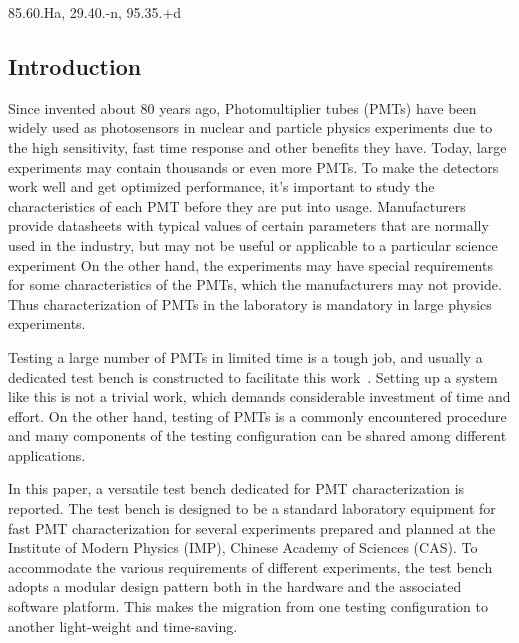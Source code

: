 \documentclass[a4paper,10pt,twoside]{cpc-hepnp}
\begin{document}
\begin{CJK*}{UTF8}{gbsn}
\begin{pacs}
85.60.Ha, 29.40.-n, 95.35.+d 
\end{pacs}

%

\begin{multicols}{2}

\section{Introduction}
\label{sec:introduction}

Since invented about 80 years ago, Photomultiplier tubes (PMTs) have been widely used as photosensors in nuclear and particle physics experiments due to the high sensitivity, fast time response and other benefits they have. 
Today, large experiments may contain thousands or even more PMTs. To make the detectors work well and get optimized performance, it's important to study the characteristics of each PMT before they are put into usage. 
Manufacturers provide datasheets with typical values of certain parameters that are normally used in the industry, but may not be useful or applicable to a particular science experiment
On the other hand, the experiments may have special requirements for some characteristics of the PMTs, which the manufacturers may not provide. 
Thus characterization of PMTs in the laboratory is mandatory in large physics experiments.

Testing a large number of PMTs in limited time is a tough job, and usually a dedicated test bench is constructed to facilitate this work~\citep{barnhill_testing_2008,akgun_complete_2005,adragna_pmt-block_2006}.
Setting up a system like this is not a trivial work, which demands considerable investment of time and effort.
On the other hand, testing of PMTs is a commonly encountered procedure and many components of the testing configuration can be shared among different applications.

In this paper, a versatile test bench dedicated for PMT characterization is reported.
The test bench is designed to be a standard laboratory equipment for fast PMT characterization for several experiments prepared and planned at the Institute of Modern Physics (IMP), Chinese Academy of Sciences (CAS).
To accommodate the various requirements of different experiments, the test bench adopts a modular design pattern both in the hardware and the associated software platform.
This makes the migration from one testing configuration to another light-weight and time-saving.


\end{multicols}
\end{CJK*}
\end{document}
